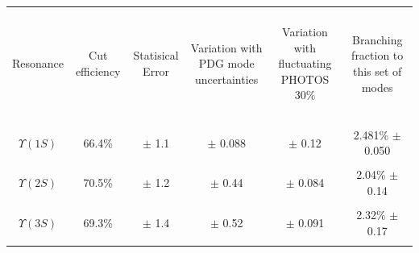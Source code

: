 \documentclass[landscape]{article}
\begin{document}
\begin{center}
  \begin{tabular}{c | c c c c | c}
    \hline\hline
    & & & & & \\
    \begin{minipage}{3 cm} \begin{center} Resonance \end{center} \end{minipage} &
    \begin{minipage}{2 cm} \begin{center} Cut efficiency \end{center} \end{minipage} &
    \begin{minipage}{2 cm} \begin{center} Statisical Error \end{center} \end{minipage} &
    \begin{minipage}{4 cm} \begin{center} Variation with PDG mode uncertainties \end{center} \end{minipage} &
    \begin{minipage}{4 cm} \begin{center} Variation with fluctuating PHOTOS 30\% \end{center} \end{minipage} &
    \begin{minipage}{3 cm} \begin{center} Branching fraction to this set of modes \end{center} \end{minipage} \\
    & & & & & \\\hline
    & & & & & \\
    $\Upsilon(1S)$ & 66.4\% & $\pm$ 1.1 & $\pm$ 0.088 & $\pm$ 0.12 & 2.481\% $\pm$ 0.050 \\
    & & & & & \\
    $\Upsilon(2S)$ & 70.5\% & $\pm$ 1.2 & $\pm$ 0.44 & $\pm$ 0.084 & 2.04\% $\pm$ 0.14 \\
    & & & & & \\
    $\Upsilon(3S)$ & 69.3\% & $\pm$ 1.4 & $\pm$ 0.52 & $\pm$ 0.091 & 2.32\% $\pm$ 0.17 \\
    & & & & & \\\hline\hline
  \end{tabular}
\end{center}
\end{document}
